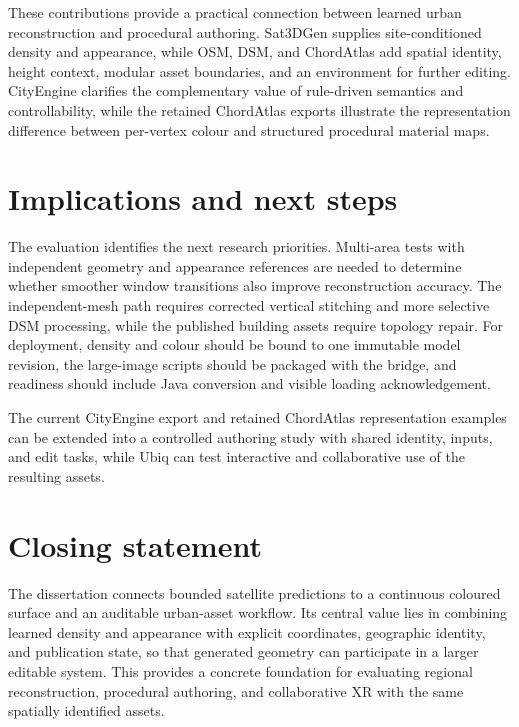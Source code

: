 These contributions provide a practical connection between learned urban
reconstruction and procedural authoring.  Sat3DGen supplies site-conditioned
density and appearance, while OSM, DSM, and ChordAtlas add spatial identity,
height context, modular asset boundaries, and an environment for further
editing.  CityEngine clarifies the complementary value of rule-driven
semantics and controllability, while the retained ChordAtlas exports illustrate
the representation difference between per-vertex colour and structured
procedural material maps.

\section{Implications and next steps}

The evaluation identifies the next research priorities.  Multi-area tests with
independent geometry and appearance references are needed to determine whether
smoother window transitions also improve reconstruction accuracy.  The
independent-mesh path requires corrected vertical stitching and more selective
DSM processing, while the published building assets require topology repair.
For deployment, density and colour should be bound to one immutable model
revision, the large-image scripts should be packaged with the bridge, and
readiness should include Java conversion and visible loading acknowledgement.

The current CityEngine export and retained ChordAtlas representation examples
can be extended into a controlled authoring study with shared identity, inputs,
and edit tasks, while
Ubiq can test interactive and collaborative use of the resulting assets.

\section{Closing statement}

The dissertation connects bounded satellite predictions to a continuous
coloured surface and an auditable urban-asset workflow.  Its central value lies
in combining learned
density and appearance with explicit coordinates, geographic identity, and
publication state, so that generated geometry can participate in a larger
editable system.  This provides a concrete foundation for evaluating regional
reconstruction, procedural authoring, and collaborative XR with the same
spatially identified assets.
